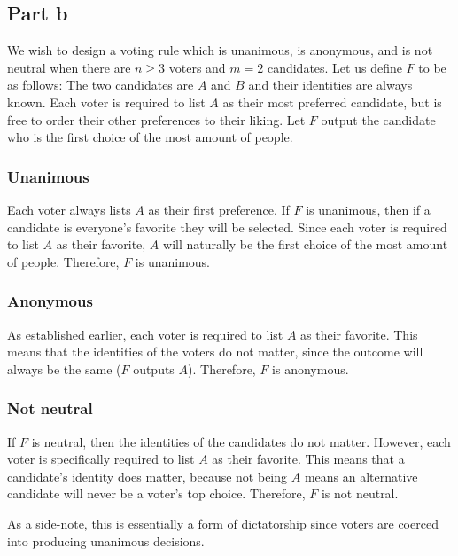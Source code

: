\documentclass[12pt]{article}%
\begin{document}
\subsection*{Part b}
We wish to design a voting rule which is unanimous, is anonymous, and is not neutral when there are $n \ge 3$ voters and $m = 2$ candidates. Let us define $F$ to be as follows: The two candidates are $A$ and $B$ and their identities are always known. Each voter is required to list $A$ as their most preferred candidate, but is free to order their other preferences to their liking. Let $F$ output the candidate who is the first choice of the most amount of people.

\subsubsection*{Unanimous}
Each voter always lists $A$ as their first preference. If $F$ is unanimous, then if a candidate is everyone's favorite they will be selected. Since each voter is required to list $A$ as their favorite, $A$ will naturally be the first choice of the most amount of people. Therefore, $F$ is unanimous.

\subsubsection*{Anonymous}
As established earlier, each voter is required to list $A$ as their favorite. This means that the identities of the voters do not matter, since the outcome will always be the same ($F$ outputs $A$). Therefore, $F$ is anonymous.

\subsubsection*{Not neutral}
If $F$ is neutral, then the identities of the candidates do not matter. However, each voter is specifically required to list $A$ as their favorite. This means that a candidate's identity does matter, because not being $A$ means an alternative candidate will never be a voter's top choice. Therefore, $F$ is not neutral.

As a side-note, this is essentially a form of dictatorship since voters are coerced into producing unanimous decisions.
\end{document}
